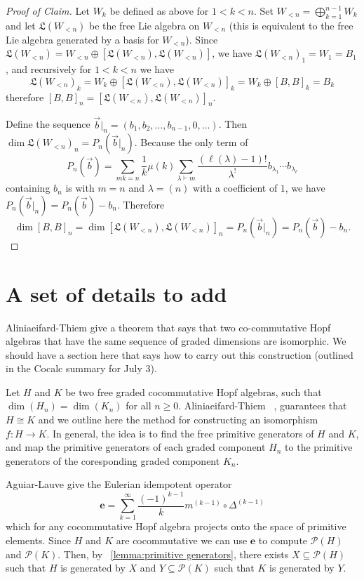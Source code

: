 \documentclass[11pt]{amsart}
\theoremstyle{definition}
\numberwithin{equation}{section}
\begin{document}
\begin{proof}[Proof of Claim]
Let $W_k$ be defined as above for $1 < k < n.$ Set $W_{<n} = \bigoplus_{k=1}^{n-1} W_k$ and let $\mathfrak{L}(W_{<n})$ be the free Lie algebra on $W_{<n}$  (this is equivalent to the free Lie algebra generated by a basis for $W_{<n}$). Since $\mathfrak{L}(W_{<n}) = W_{<n} \oplus [\mathfrak{L}(W_{<n}) , \mathfrak{L}(W_{<n})]$, we have $\mathfrak{L}(W_{<n})_1 = W_1 = B_1$, and recursively for $1 < k <n$ we have
\[
\mathfrak{L}(W_{<n})_k = W_k \oplus [\mathfrak{L}(W_{<n}) , \mathfrak{L}(W_{<n})]_k = W_k \oplus [B,B]_k = B_k
\]
therefore $[B,B]_n = [\mathfrak{L}(W_{<n}),\mathfrak{L}(W_{<n})]_n$.

Define the sequence $\vec{b} \vert_n = (b_1,b_2, \ldots , b_{n-1}, 0, \ldots)$. Then $\dim \mathfrak{L}(W_{<n})_n = P_n(\vec{b}|_n)$. Because the only term of 
\[ 
P_n(\vec{b}) = \sum_{mk=n} \frac{1}{k}\mu (k) \sum_{\lambda \vdash m} \frac{(\ell(\lambda)-1)!}{\lambda^!}b_{\lambda_1} \cdots b_{\lambda_{\ell}}
\]
containing $b_n$ is with $m = n$ and $\lambda = (n)$ with a coefficient of $1$, we have $P_n(\vec{b}|_n) = P_n(\vec{b}) - b_n$. Therefore
\[
\dim [B,B]_n = \dim [\mathfrak{L}(W_{<n}),\mathfrak{L}(W_{<n})]_n = P_n(\vec{b}|_n) = P_n(\vec{b})-b_n.
\]
\end{proof}

\section{A set of details to add}

Aliniaeifard-Thiem \cite[Theorem 4.2]{AT22} give a theorem that says that two co-commutative Hopf algebras that
have the same sequence of graded dimensions are isomorphic.  We should have a section here
that says how to carry out this construction (outlined in the Cocalc summary for July 3).

Let \(H\) and \(K\) be two free graded cocommutative Hopf algebras, such that \(\dim(H_n) = \dim(K_n)\) for all \(n \geq 0\).
Aliniaeifard-Thiem  ~\cite[Theorem 4.2]{AT22}, guarantees that \(H \cong K\) and we outline here the method for constructing an 
isomorphism \(f:H \to K\).  In general, the idea is to find the free primitive generators of \(H\) and \(K\), and map the primitive generators of 
each graded component \(H_n\) to the primitive generators of the  coresponding graded component \(K_n\).

Aguiar-Lauve \cite{AL15} give the Eulerian idempotent operator
\[
    \mathbf{e} = \sum_{k=1}^\infty \frac{(-1)^{k-1}}{k} m^{(k-1)}\circ \Delta^{(k-1)}
\]
which for any cocommutative Hopf algebra projects onto the space of primitive elements. Since \(H\) and \(K\) are cocommutative
we can use \(\mathbf{e}\) to compute  \(\mathcal{P}(H)\) and \(\mathcal{P}(K)\).
Then, by ~\ref{lemma:primitive generators}, there exists \(X \subseteq \mathcal{P}(H)\) such that \(H\) is generated by \(X\)
and  \(Y \subseteq \mathcal{P}(K)\) such that  \(K\) is  generated by \(Y\).
\end{document}
